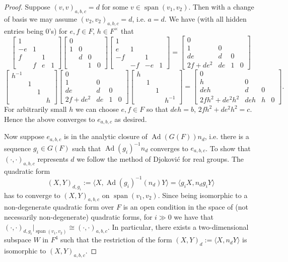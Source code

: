 \documentclass[11pt]{amsart}
\theoremstyle{remark}
\newcommand{\f}{\mathfrak{f}}
\newcommand{\Ad}{\operatorname{Ad}}
\renewcommand{\span}{\operatorname{span}}
\newcommand{\matr}[1]{\left[\begin{matrix}#1\end{matrix}\right]}
\begin{document}
\begin{proof} Suppose $(v,v)_{a,b,c}=d$ for some $v\in\span(v_1,v_2)$. Then with a change of basis we may assume $(v_2,v_2)_{a,b,c}=d$, i.e. $a=d$. We have (with all hidden entries being $0$'s) for $e,f\in F$, $h\in F^{\times}$ that
\[
\matr{1&&&\\-e&1&&\\f&&1&\\&f&e&1}\matr{
	0&&&\\
	1&0&&\\
	&d&0&\\
	&&1&0
}\matr{1&&&\\e&1&&\\-f&&1&\\&-f&-e&1}=\matr{0&&&\\1&0&&\\de&d&0&\\2f+de^2&de&1&0}\]
\[
\matr{h^{-1}&&&\\&1&&\\&&1&\\&&&h}\matr{0&&&\\1&0&&\\de&d&0&\\2f+de^2&de&1&0}\matr{h&&&\\&1&&\\&&1&\\&&&h^{-1}}=\matr{0&&&\\h&0&&\\deh&d&0&\\2fh^2+de^2h^2&deh&h&0}.
\]
For arbitrarily small $h$ we can choose $e,f\in F$ so that $deh=b$, $2fh^2+de^2h^2=c$. Hence the above converges to $e_{a,b,c}$ as desired.
	
Now suppose $e_{a,b,c}$ is in the analytic closure of $\Ad(G(F))n_d$, i.e. there is a sequence $g_i\in G(F)$ such that $\Ad(g_i)^{-1}n_d$ converges to $e_{a,b,c}$. To show that $(\cdot,\cdot)_{a,b,c}$ represents $d$ we follow the method of Djokovi\'{c} \cite[Thm. 6]{Djo81} for real groups. The quadratic form
\[
	(X,Y)_{d,g_i}:=\langle X,\Ad(g_i)^{-1}(n_d)Y\rangle=\langle g_iX,n_dg_iY\rangle
\]
has to converge to $(X,Y)_{a,b,c}$ on $\span(v_1,v_2)$. Since being isomorphic to a non-degenerate quadratic form over $F$ is an open condition in the space of (not necessarily non-degenerate) quadratic forms, for $i\gg 0$ we have that $(\cdot,\cdot)_{d,g_i}|_{\span(v_1,v_2)}\cong(\cdot,\cdot)_{a,b,c}$. In particular, there exists a two-dimensional subspace $W$ in $F^4$ such that the restriction of the form $(X,Y)_d:=\langle X,n_dY\rangle$ is isomorphic to $(X,Y)_{a,b,c}$.


\end{proof}
\end{document}
